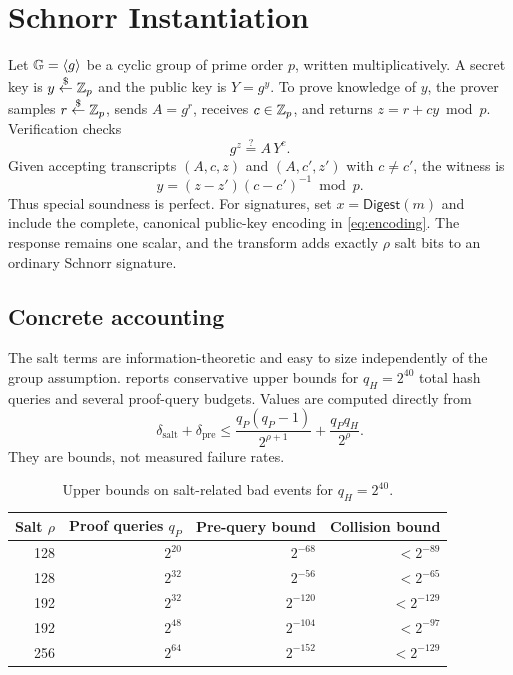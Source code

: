 \section{Schnorr Instantiation}
\label{sec:schnorr}

Let $\mathbb{G}=\langle g\rangle$ be a cyclic group of prime order $p$, written
multiplicatively.  A secret key is $y\mathrel{\mathop{\leftarrow}\limits^{\$}}\mathbb{Z}_p$ and the public key is
$Y=g^y$.  To prove knowledge of $y$, the prover samples $r\mathrel{\mathop{\leftarrow}\limits^{\$}}\mathbb{Z}_p$, sends
$A=g^r$, receives $c\in\mathbb{Z}_p$, and returns $z=r+cy\bmod p$.  Verification checks
\begin{equation}
  \label{eq:schnorr-verify}
  g^z \stackrel{?}{=} A\,Y^c.
\end{equation}
Given accepting transcripts $(A,c,z)$ and $(A,c',z')$ with $c\ne c'$, the
witness is
\begin{equation}
  \label{eq:schnorr-extract}
  y=(z-z')(c-c')^{-1}\bmod p.
\end{equation}
Thus special soundness is perfect.  For signatures, set
$x=\mathsf{Digest}(m)$ and include the complete, canonical public-key encoding
in \cref{eq:encoding}.  The response remains one scalar, and the transform adds
exactly $\rho$ salt bits to an ordinary Schnorr signature.

\subsection{Concrete accounting}

The salt terms are information-theoretic and easy to size independently of the
group assumption.   reports conservative upper bounds for
$q_H=2^{40}$ total hash queries and several proof-query budgets.  Values are
computed directly from
\[
  \delta_{\mathrm{salt}}+\delta_{\mathrm{pre}}
  \le \frac{q_P(q_P-1)}{2^{\rho+1}}+\frac{q_Pq_H}{2^\rho}.
\]
They are bounds, not measured failure rates.

\begin{table}[t]
  \caption{Upper bounds on salt-related bad events for $q_H=2^{40}$.}
  \label{tab:parameters}
  \centering
  \small
  \begin{tabular}{@{}rrrr@{}}
    \toprule
    Salt $\rho$ & Proof queries $q_P$ & Pre-query bound & Collision bound \\
    \midrule
    128 & $2^{20}$ & $2^{-68}$ & $<2^{-89}$ \\
    128 & $2^{32}$ & $2^{-56}$ & $<2^{-65}$ \\
    192 & $2^{32}$ & $2^{-120}$ & $<2^{-129}$ \\
    192 & $2^{48}$ & $2^{-104}$ & $<2^{-97}$ \\
    256 & $2^{64}$ & $2^{-152}$ & $<2^{-129}$ \\
    \bottomrule
  \end{tabular}
\end{table}

